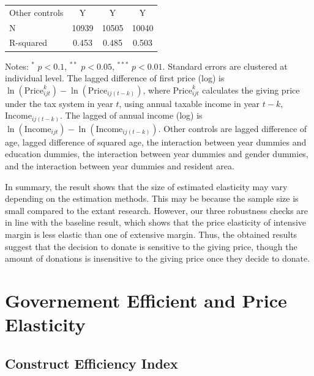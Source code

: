\documentclass[ review  , 3p ]{elsarticle}
\begin{document}
\begin{table}
\begin{threeparttable}
\begin{tabular}[t]{lccc}
  \hspace{1em}Other controls & Y & Y & Y\\
  \hspace{1em}N & 10939 & 10505 & 10040\\
  \hspace{1em}R-squared & 0.453 & 0.485 & 0.503\\
  \bottomrule
  \end{tabular}
  \begin{tablenotes}
  \item Notes: $^{*}$ $p < 0.1$, $^{**}$ $p < 0.05$, $^{***}$ $p < 0.01$. Standard errors are clustered at individual level. The lagged difference of first price (log) is $\ln(\text{Price}^k_{ijt}) - \ln(\text{Price}_{ij(t-k)})$, where $\text{Price}^k_{ijt}$ calculates the giving price under the tax system in year $t$, using annual taxable income in year $t-k$, $\text{Income}_{ij(t-k)}$. The lagged of annual income (log) is $\ln(\text{Income}_{ijt}) - \ln(\text{Income}_{ij(t-k)})$. Other controls are lagged difference of age, lagged difference of squared age, the interaction between year dummies and education dummies, the interaction between year dummies and gender dummies, and the interaction between year dummies and resident area.
  \end{tablenotes}
  \end{threeparttable}
  \end{table}

  In summary, the result shows that the size of estimated elasticity may vary depending on the estimation methods. This may be because the sample size is small compared to the extant research. However, our three robustness checks are in line with the baseline result, which shows that the price elasticity of intensive margin is less elastic than one of extensive margin. Thus, the obtained results suggest that the decision to donate is sensitive to the giving price, though the amount of donations is insensitive to the giving price once they decide to donate.

  \hypertarget{governement-efficient-and-price-elasticity}{%
  \section{Governement Efficient and Price Elasticity}\label{governement-efficient-and-price-elasticity}}

  \hypertarget{construct-efficiency-index}{%
  \subsection{Construct Efficiency Index}\label{construct-efficiency-index}}
\end{document}
